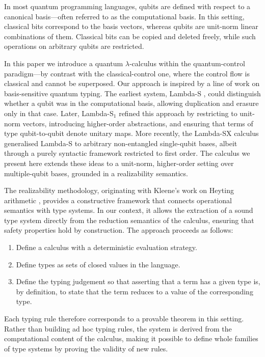 \documentclass[runningheads,orivec,envcountsame,envcountsect]{llncs}
\begin{document}
In most quantum programming languages, qubits are defined with respect to a
canonical basis—often referred to as the computational basis. In this setting,
classical bits correspond to the basis vectors, whereas qubits are unit-norm
linear combinations of them. Classical bits can be copied and deleted freely,
while such operations on arbitrary qubits are restricted.

In this paper we introduce a quantum $\lambda$-calculus within the
quantum-control paradigm—by contrast with the classical-control one, where the
control flow is classical and cannot be superposed. Our approach is inspired by
a line of work on basis-sensitive quantum typing. The earliest system,
Lambda-S \cite{DiazcaroDowekRinaldiBIO19}, could distinguish whether a qubit
was in the computational basis, allowing duplication and erasure only in that
case. Later, Lambda-S$_1$
\cite{DiazcaroGuillermoMiquelValironLICS19,DiazCaroMalherbe2022} refined this
approach by restricting to unit-norm vectors, introducing higher-order
abstractions, and ensuring that terms of type qubit-to-qubit denote unitary
maps. More recently, the Lambda-SX calculus \cite{DiazcaroMonzonAPLAS25}
generalised Lambda-S to arbitrary non-entangled single-qubit bases, albeit
through a purely syntactic framework restricted to first order. The calculus we
present here extends these ideas to a unit-norm, higher-order setting over
multiple-qubit bases, grounded in a realizability semantics.

The realizability methodology, originating with Kleene's work on Heyting
arithmetic \cite{KleeneJSL45}, provides a constructive framework that connects
operational semantics with type systems. In our context, it allows the
extraction of a sound type system directly from the reduction semantics of the
calculus, ensuring that safety properties hold by construction. The approach
proceeds as follows:
\begin{enumerate}
  \item Define a calculus with a deterministic evaluation strategy.
  \item Define types as sets of closed values in the language.
  \item Define the typing judgement so that asserting that a term has a given
  type is, by definition, to state that the term reduces to a value of the
  corresponding type.
\end{enumerate}
Each typing rule therefore corresponds to a provable theorem in this setting.
Rather than building ad hoc typing rules, the system is derived from the
computational content of the calculus, making it possible to define whole
families of type systems by proving the validity of new rules.
\end{document}
